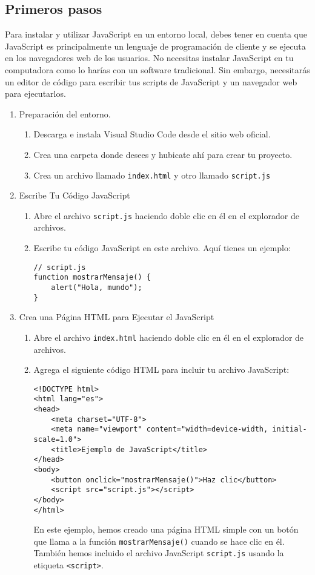 \documentclass[executivepaper]{article}
\begin{document}
\subsection{Primeros pasos}
Para instalar y utilizar JavaScript en un entorno local, debes tener en cuenta que JavaScript es principalmente un lenguaje de programación de cliente y se ejecuta en los navegadores web de los usuarios. No necesitas instalar JavaScript en tu computadora como lo harías con un software tradicional. Sin embargo, necesitarás un editor de código para escribir tus scripts de JavaScript y un navegador web para ejecutarlos.

\begin{enumerate}
  \item Preparación del entorno.
  \begin{enumerate}
    \item Descarga e instala Visual Studio Code desde el sitio web oficial.
    \item Crea una carpeta donde desees y hubicate ahí para crear tu proyecto.
    \item Crea un archivo llamado \lstinline{index.html} y otro llamado \lstinline{script.js}
  \end{enumerate}
  
  \item Escribe Tu Código JavaScript
  \begin{enumerate}
    \item Abre el archivo \lstinline{script.js} haciendo doble clic en él en el explorador de archivos.
    \item Escribe tu código JavaScript en este archivo. Aquí tienes un ejemplo:
\begin{lstlisting}
// script.js
function mostrarMensaje() {
    alert("Hola, mundo");
}
\end{lstlisting}
  \end{enumerate}

  \item Crea una Página HTML para Ejecutar el JavaScript
  \begin{enumerate}
    \item Abre el archivo \lstinline{index.html} haciendo doble clic en él en el explorador de archivos.
    \item Agrega el siguiente código HTML para incluir tu archivo JavaScript:
\begin{lstlisting}
<!DOCTYPE html>
<html lang="es">
<head>
    <meta charset="UTF-8">
    <meta name="viewport" content="width=device-width, initial-scale=1.0">
    <title>Ejemplo de JavaScript</title>
</head>
<body>
    <button onclick="mostrarMensaje()">Haz clic</button>
    <script src="script.js"></script>
</body>
</html>
\end{lstlisting}
  En este ejemplo, hemos creado una página HTML simple con un botón que llama a la función \lstinline{mostrarMensaje()} cuando se hace clic en él. También hemos incluido el archivo JavaScript \lstinline{script.js} usando la etiqueta \lstinline{<script>}.
  \end{enumerate}


\end{enumerate}
\end{document}
